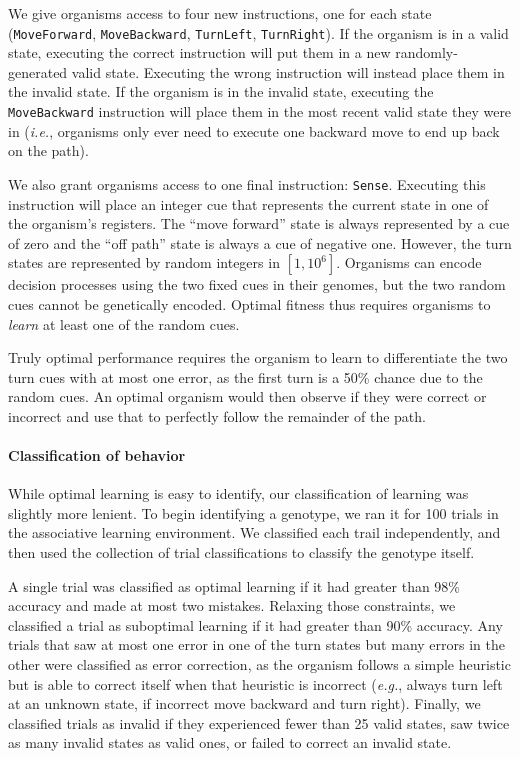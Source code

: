 We give organisms access to four new instructions, one for each state (\texttt{MoveForward}, \texttt{MoveBackward}, \texttt{TurnLeft}, \texttt{TurnRight}).
If the organism is in a valid state, executing the correct instruction will put them in a new randomly-generated valid state.
Executing the wrong instruction will instead place them in the invalid state. 
If the organism is in the invalid state, executing the \texttt{MoveBackward} instruction will place them in the most recent valid state they were in (\textit{i.e.}, organisms only ever need to execute one backward move to end up back on the path). 

We also grant organisms access to one final instruction: \texttt{Sense}. 
Executing this instruction will place an integer cue that represents the current state in one of the organism's registers. 
The ``move forward'' state is always represented by a cue of zero and the ``off path'' state is always a cue of negative one. 
However, the turn states are represented by random integers in $[1, 10^{6}]$. 
Organisms can encode decision processes using the two fixed cues in their genomes, but the two random cues cannot be genetically encoded.
Optimal fitness thus requires organisms to \textit{learn} at least one of the random cues. 

Truly optimal performance requires the organism to learn to differentiate the two turn cues with at most one error, as the first turn is a 50\% chance due to the random cues. 
An optimal organism would then observe if they were correct or incorrect and use that to perfectly follow the remainder of the path. 

\paragraph{Classification of behavior}
\label{subsubsub:avida:learning:classification}

While optimal learning is easy to identify, our classification of learning was slightly more lenient. 
To begin identifying a genotype, we ran it for 100 trials in the associative learning environment. 
We classified each trail independently, and then used the collection of trial classifications to classify the genotype itself. 

A single trial was classified as optimal learning if it had greater than 98\% accuracy and made at most two mistakes. 
Relaxing those constraints, we classified a trial as suboptimal learning if it had greater than 90\% accuracy. 
Any trials that saw at most one error in one of the turn states but many errors in the other were classified as error correction, as the organism follows a simple heuristic but is able to correct itself when that heuristic is incorrect (\textit{e.g.}, always turn left at an unknown state, if incorrect move backward and turn right). 
Finally, we classified trials as invalid if they experienced fewer than 25 valid states, saw twice as many invalid states as valid ones, or failed to correct an invalid state. 

